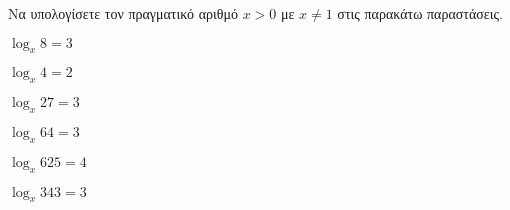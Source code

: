 Να υπολογίσετε τον πραγματικό αριθμό $ x>0$ με $ x\neq 1 $ στις παρακάτω παραστάσεις.
\begin{multicols}{2}
\begin{rlist}
\item $ \log_{x}{8}=3 $
\item $ \log_{x}{4}=2 $
\item $ \log_{x}{27}=3 $
\item $ \log_{x}{64}=3 $
\item $ \log_{x}{625}=4 $
\item $ \log_{x}{343}=3 $
\end{rlist}
\end{multicols}
